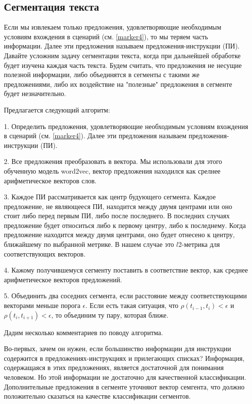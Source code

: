 \documentclass[12pt]{article}
\begin{document}
\subsection{Сегментация текста}
\label{segmentation}

Если мы извлекаем только предложения, удовлетворяющие необходимым условиям вхождения в сценарий (см. \ref{marker4}), то мы теряем часть информации. Далее эти предложения называем предложения-инструкции (ПИ). Давайте усложним задачу сегментации текста, когда при дальнейшей обработке будет изучена каждая часть текста. Будем считать, что предложения не несущие полезной информации, либо объединятся в сегменты с такими же предложениями, либо их воздействие на "полезные" предложения в сегменте будет незначительно.

Предлагается следующий алгоритм:


	1. Определить предложения, удовлетворяющие необходимым условиям вхождения в сценарий (см. \ref{marker4}). Далее эти предложения называем предложения-инструкции (ПИ). 

	2. Все предложения преобразовать в вектора. Мы использовали для этого обученную модель word2vec, вектор предложения находился как срелнее арифметическое векторов слов.

	3. Каждое ПИ рассматривается как центр будующего сегмента. Каждое предложение, не являющееся ПИ, находится между двумя центрами или оно стоит либо перед первым ПИ, либо после последнего. В последних случаях предложение будет относиться либо к первому центру, либо к последнему. Когда предложение находится между двумя центрами, оно будет отнесено к центру, ближайшему по выбранной метрике. В нашем случае это $l2$-метрика для соответствующих векторов.
	
	4. Кажому получившемуся сегменту поставить в соответствие вектор, как среднее арифметическое векторов предложений.
	
	5. Объединить два соседних сегмента, если расстояние между соответствующими векторами меньше порога $\epsilon$. Если есть такая ситуация, что $\rho(t_{i-1}, t_i)<\epsilon$ и $\rho(t_i, t_{i+1})<\epsilon$, то объединим ту пару, которая ближе.
	
Дадим несколько комментариев по поводу алгоритма.

Во-первых, зачем он нужен, если большинство информации для инструкции содержится в предложениях-инструкциях и прилегающих списках? Информация, содержащаяся в этих предложениях, является достаточной для понимания человеком. Но этой информации не достаточно для качественной классификации. Дополнительные предложения в сегменте уточняют вектор семгента, что должно положительно сказаться на качестве классификации сегментов.
\end{document}
